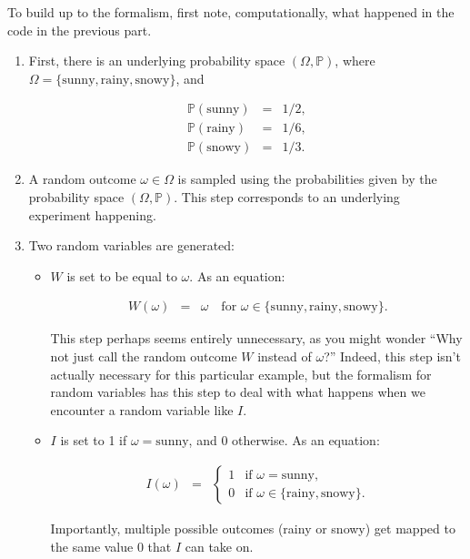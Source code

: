 \documentclass[6008notes.tex]{subfiles}
\begin{document}
To build up to the formalism, first note, computationally, what happened in the code in the previous part.

\begin{enumerate}
\item First, there is an underlying probability space $(\Omega , \mathbb {P})$, where $\Omega = \{ \text {sunny}, \text {rainy}, \text {snowy}\}$, and

\begin{eqnarray*}
\mathbb{P}(\text{sunny}) &=& 1/2, \\
\mathbb{P}(\text{rainy}) &=& 1/6, \\
\mathbb{P}(\text{snowy}) &=& 1/3.
\end{eqnarray*}

\item A random outcome $\omega \in \Omega$ is sampled using the probabilities given by the probability space $(\Omega , \mathbb {P})$. This step corresponds to an underlying experiment happening.

\item Two random variables are generated:

\begin{itemize}
\item $W$ is set to be equal to $\omega$. As an equation:

\begin{eqnarray*}
W(\omega) &=&\omega\quad\text{for }\omega\in\{\text{sunny},\text{rainy},\text{snowy}\}.
\end{eqnarray*}

This step perhaps seems entirely unnecessary, as you might wonder ``Why not just call the random outcome $W$ instead of $\omega$?'' Indeed, this step isn't actually necessary for this particular example, but the formalism for random variables has this step to deal with what happens when we encounter a random variable like $I$.

\item $I$ is set to 1 if $\omega =\text {sunny}$, and 0 otherwise. As an equation:

\begin{eqnarray*}
I(\omega)
&=&
\begin{cases}
  1 & \text{if }\omega=\text{sunny}, \\
  0 & \text{if }\omega\in\{\text{rainy},\text{snowy}\}.
\end{cases}
\end{eqnarray*}

Importantly, multiple possible outcomes (rainy or snowy) get mapped to the same value 0 that $I$ can take on.
\end{itemize}
\end{enumerate}
\end{document}
